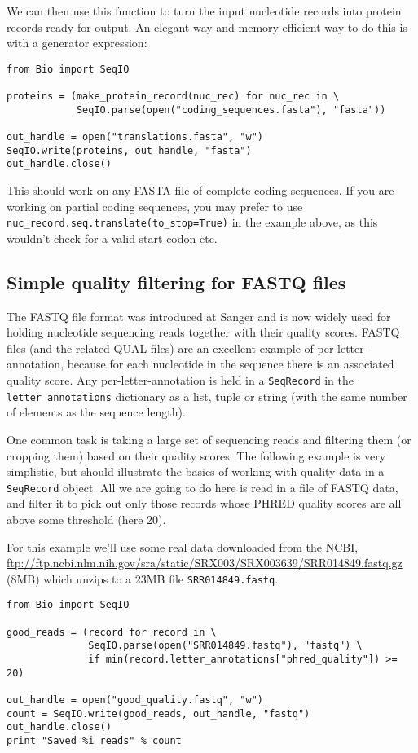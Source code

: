 \documentclass{report}
\begin{document}
We can then use this function to turn the input nucleotide records into protein
records ready for output.  An elegant way and memory efficient way to do this
is with a generator expression:

\begin{verbatim}
from Bio import SeqIO

proteins = (make_protein_record(nuc_rec) for nuc_rec in \
            SeqIO.parse(open("coding_sequences.fasta"), "fasta"))

out_handle = open("translations.fasta", "w")
SeqIO.write(proteins, out_handle, "fasta")
out_handle.close()
\end{verbatim}

This should work on any FASTA file of complete coding sequences.
If you are working on partial coding sequences, you may prefer to use
\verb|nuc_record.seq.translate(to_stop=True)| in the example above, as
this wouldn't check for a valid start codon etc.

\subsection{Simple quality filtering for FASTQ files}
\label{sec:FASTQ-filtering-example}

The FASTQ file format was introduced at Sanger and is now widely used for
holding nucleotide sequencing reads together with their quality scores.
FASTQ files (and the related QUAL files) are an excellent example of
per-letter-annotation, because for each nucleotide in the sequence there is
an associated quality score.  Any per-letter-annotation is held in a
\verb|SeqRecord| in the \verb|letter_annotations| dictionary as a list,
tuple or string (with the same number of elements as the sequence length).

One common task is taking a large set of sequencing reads and filtering them
(or cropping them) based on their quality scores.
The following example is very simplistic, but should illustrate the basics of
working with quality data in a \verb|SeqRecord| object.  All we are going to
do here is read in a file of FASTQ data, and filter it to pick out only those
records whose PHRED quality scores are all above some threshold (here 20).

For this example we'll use some real data downloaded from the NCBI,
\url{ftp://ftp.ncbi.nlm.nih.gov/sra/static/SRX003/SRX003639/SRR014849.fastq.gz}
(8MB) which unzips to a 23MB file \texttt{SRR014849.fastq}.

\begin{verbatim}
from Bio import SeqIO

good_reads = (record for record in \
              SeqIO.parse(open("SRR014849.fastq"), "fastq") \
              if min(record.letter_annotations["phred_quality"]) >= 20)

out_handle = open("good_quality.fastq", "w")
count = SeqIO.write(good_reads, out_handle, "fastq")
out_handle.close()
print "Saved %i reads" % count
\end{verbatim}
\end{document}

